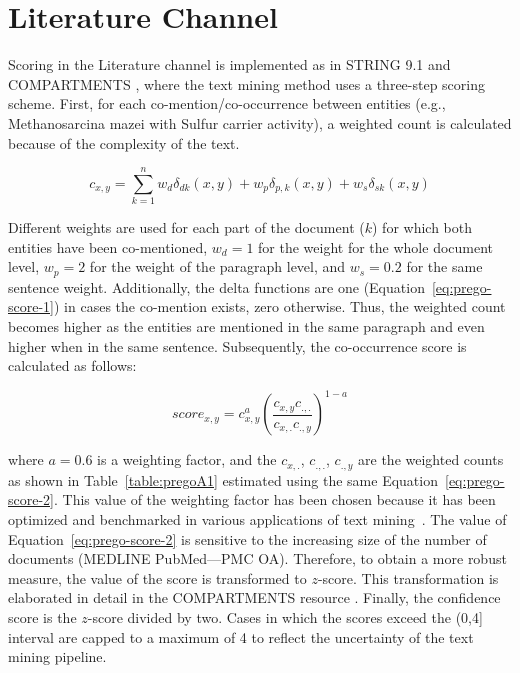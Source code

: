 {\section*{Literature Channel}

Scoring in the Literature channel is implemented as in STRING 9.1 \parencite{franceschini2012string} and COMPARTMENTS \parencite{binder2014compartments}, where the text mining method uses a three-step scoring scheme. 
First, for each co-mention/co-occurrence between entities (e.g., Methanosarcina mazei with Sulfur carrier activity), a weighted count is calculated because of the complexity of the text.  


\begin{equation}
   c_{x,y} = \sum_{k=1}^{n}{w_d \delta_{dk}(x,y) +w_p \delta_{p,k}(x,y) + w_s \delta_{sk}(x,y)}
   \label{eq:prego-score-1}
\end{equation}



Different weights are used for each part of the document ($k$) for which both entities have been co-mentioned, $w_d = 1$ for the weight for the whole document level, $w_p = 2$ for the weight of the paragraph level, and $w_s = 0.2$ for the same sentence weight. 
Additionally, the delta functions are one (Equation~\ref{eq:prego-score-1}) in cases the co-mention exists, zero otherwise. Thus, the weighted count becomes higher as the entities are mentioned in the same paragraph and even higher when in the same sentence.
Subsequently, the co-occurrence score is calculated as follows:

\begin{equation}
   score_{x,y} = c_{x,y}^a (\frac{c_{x,y} c_{.,.}}{c_{x, .}c_{.,y}})^{1-a}
   \label{eq:prego-score-2}
\end{equation}
   


where $a = 0.6$ is a weighting factor, and the $c_{x,.}$, $c_{.,.}$, 
$c_{.,y}$ are the weighted counts as shown in Table~\ref{table:pregoA1} estimated using the same Equation~\ref{eq:prego-score-2}. 
This value of the weighting factor has been chosen because it has been optimized and benchmarked in various 
applications of text mining~\parencite{franceschini2012string, binder2014compartments, pletscher2015diseases}. 
The value of Equation~\ref{eq:prego-score-2} is sensitive to the increasing size of the number of documents (MEDLINE PubMed—PMC OA).
Therefore, to obtain a more robust measure, the value of the score is transformed to $z$-score. 
This transformation is elaborated in detail in the COMPARTMENTS resource \parencite{binder2014compartments}. 
Finally, the confidence score is the $z$-score divided by two. Cases in which the scores exceed the (0,4] interval are capped to a maximum of 4 to reflect the uncertainty of the text mining pipeline.

}
